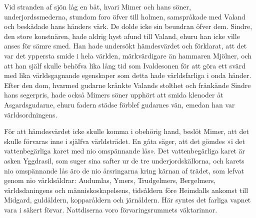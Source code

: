 Vid stranden af sjön låg en båt, hvari Mimer och hans söner,
underjordssmederna, stundom foro öfver till holmen, samspråkade med
Valand och beskådade hans händers värk. De dolde icke sin beundran öfver
dem. Sindre, den store konstnären, hade aldrig hyst afund till Valand,
ehuru han
\protect\hypertarget{lb1625905.xhtmlux5cux23start101}{}{}\protect\hypertarget{lb1625905.xhtmlux5cux23start101-a}{}{}\protect\hypertarget{lb1625905.xhtmlux5cux23start101-b}{}{}\protect\hypertarget{lb1625905.xhtmlux5cux23start101-c}{}{}\protect\hypertarget{lb1625905.xhtmlux5cux23start101-d}{}{}
icke ville anses för sämre smed. Han hade undersökt hämdesvärdet och
förklarat, att det var det yppersta smide i hela världen, märkvärdigare
än hammaren Mjölner, och att han själf skulle behöfva lika lång tid som
Ivaldesonen för att göra ett svärd med lika världsgagnande egenskaper
som detta hade världsfarliga i onda händer. Efter den dom, hvarmed
gudarne kränkte Valands stolthet och frånkände Sindre hans segerpris,
hade också Mimers söner upphört att smida klenoder åt Asgardsgudarne,
ehuru fadern städse förblef gudarnes vän, emedan han var
världsordningens.

För att hämdesvärdet icke skulle komma i obehörig hand, beslöt Mimer,
att det skulle förvaras inne i själfva världsträdet. En gåta säger, att
det gömdes »i det vattenbegärliga karet med nio omspännande lås». Det
vattenbegärliga karet är asken Yggdrasil, som suger sina safter ur de
tre underjordskällorna, och karets nio omspännande lås äro de nio
årsringarna kring kärnan af trädet, som lefvat genom nio världsåldrar:
Audumlas, Ymers, Trudgelmers, Bergelmers, världsdaningens och
människoskapelsens, tidsåldern före Heimdalls ankomst till Midgard,
guldåldern, kopparåldern och järnåldern. Här syntes det farliga vapnet
vara i säkert förvar. Nattdiserna voro förvaringsrummets väktarinnor.

